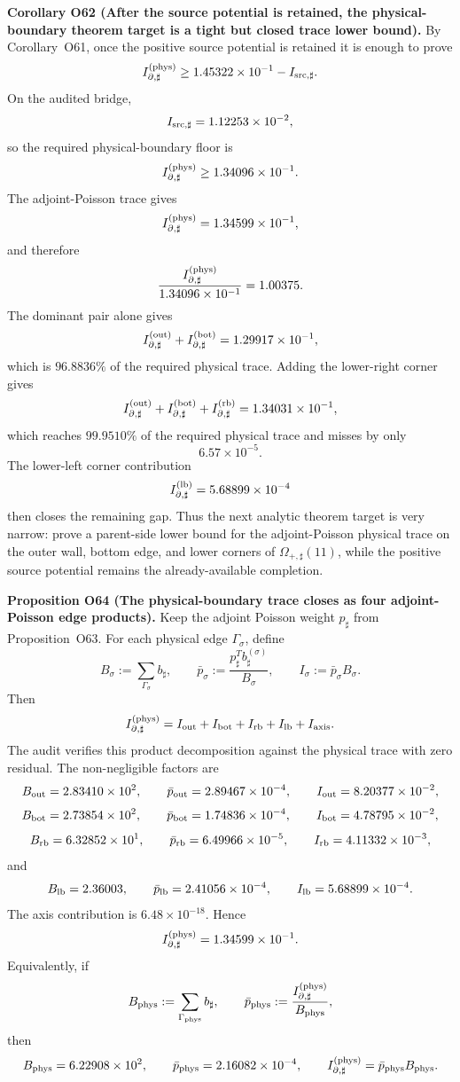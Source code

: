\documentclass[aps,prd,onecolumn,notitlepage,nofootinbib,superscriptaddress,11pt,floatfix]{revtex4-2}
\begin{document}
\medskip\noindent\textbf{Corollary O62 (After the source potential is retained, the physical-boundary theorem target is a tight but closed trace lower bound).}
By Corollary~O61, once the positive source potential is retained it is enough to prove
\[
I_{\partial,\sharp}^{(\rm phys)}
\ge
1.45322\times10^{-1}-I_{{\rm src},\sharp}.
\]
On the audited bridge,
\[
I_{{\rm src},\sharp}=1.12253\times10^{-2},
\]
so the required physical-boundary floor is
\[
I_{\partial,\sharp}^{(\rm phys)}
\ge
1.34096\times10^{-1}.
\]
The adjoint-Poisson trace gives
\[
I_{\partial,\sharp}^{(\rm phys)}=1.34599\times10^{-1},
\]
and therefore
\[
\frac{I_{\partial,\sharp}^{(\rm phys)}}{1.34096\times10^{-1}}=1.00375.
\]
The dominant pair alone gives
\[
I_{\partial,\sharp}^{(\rm out)}+I_{\partial,\sharp}^{(\rm bot)}
=
1.29917\times10^{-1},
\]
which is \(96.8836\%\) of the required physical trace.  Adding the lower-right corner gives
\[
I_{\partial,\sharp}^{(\rm out)}+I_{\partial,\sharp}^{(\rm bot)}+I_{\partial,\sharp}^{(\rm rb)}
=
1.34031\times10^{-1},
\]
which reaches \(99.9510\%\) of the required physical trace and misses by only
\[
6.57\times10^{-5}.
\]
The lower-left corner contribution
\[
I_{\partial,\sharp}^{(\rm lb)}=5.68899\times10^{-4}
\]
then closes the remaining gap.  Thus the next analytic theorem target is very narrow: prove a parent-side lower bound for the adjoint-Poisson physical trace on the outer wall, bottom edge, and lower corners of \(\Omega_{+,\sharp}(11)\), while the positive source potential remains the already-available completion.

\medskip\noindent\textbf{Proposition O64 (The physical-boundary trace closes as four adjoint-Poisson edge products).}
Keep the adjoint Poisson weight \(p_\sharp\) from Proposition~O63.  For each physical edge \(\Gamma_\sigma\), define
\[
B_\sigma:=\sum_{\Gamma_\sigma} b_\sharp,
\qquad
\bar p_\sigma:=\frac{p_\sharp^T b_\sharp^{(\sigma)}}{B_\sigma},
\qquad
I_\sigma:=\bar p_\sigma B_\sigma.
\]
Then
\[
I_{\partial,\sharp}^{(\rm phys)}
=
I_{\rm out}+I_{\rm bot}+I_{\rm rb}+I_{\rm lb}+I_{\rm axis}.
\]
The audit
verifies this product decomposition against the physical trace with zero residual.  The non-negligible factors are
\[
B_{\rm out}=2.83410\times10^{2},
\qquad
\bar p_{\rm out}=2.89467\times10^{-4},
\qquad
I_{\rm out}=8.20377\times10^{-2},
\]
\[
B_{\rm bot}=2.73854\times10^{2},
\qquad
\bar p_{\rm bot}=1.74836\times10^{-4},
\qquad
I_{\rm bot}=4.78795\times10^{-2},
\]
\[
B_{\rm rb}=6.32852\times10^{1},
\qquad
\bar p_{\rm rb}=6.49966\times10^{-5},
\qquad
I_{\rm rb}=4.11332\times10^{-3},
\]
and
\[
B_{\rm lb}=2.36003,
\qquad
\bar p_{\rm lb}=2.41056\times10^{-4},
\qquad
I_{\rm lb}=5.68899\times10^{-4}.
\]
The axis contribution is \(6.48\times10^{-18}\).  Hence
\[
I_{\partial,\sharp}^{(\rm phys)}
=
1.34599\times10^{-1}.
\]
Equivalently, if
\[
B_{\rm phys}:=\sum_{\Gamma_{\rm phys}}b_\sharp,
\qquad
\bar p_{\rm phys}:=\frac{I_{\partial,\sharp}^{(\rm phys)}}{B_{\rm phys}},
\]
then
\[
B_{\rm phys}=6.22908\times10^{2},
\qquad
\bar p_{\rm phys}=2.16082\times10^{-4},
\qquad
I_{\partial,\sharp}^{(\rm phys)}=\bar p_{\rm phys}B_{\rm phys}.
\]
\end{document}
